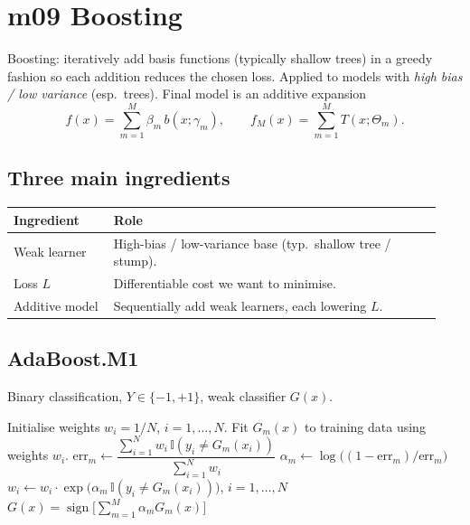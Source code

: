 \section{m09 Boosting}

Boosting: iteratively add basis functions (typically shallow trees) in a greedy fashion so each addition reduces the chosen loss. Applied to models with \emph{high bias / low variance} (esp.\ trees). Final model is an additive expansion
\[ f(x)=\sum_{m=1}^M \beta_m\, b(x;\gamma_m), \qquad f_M(x)=\sum_{m=1}^M T(x;\Theta_m). \]

\subsection{Three main ingredients}
\begin{tabular}{@{}p{0.22\linewidth} p{0.72\linewidth}@{}}
\toprule
Ingredient & Role \\
\midrule
Weak learner & High-bias / low-variance base (typ.\ shallow tree / stump). \\
Loss $L$ & Differentiable cost we want to minimise. \\
Additive model & Sequentially add weak learners, each lowering $L$. \\
\bottomrule
\end{tabular}

\subsection{AdaBoost.M1}
Binary classification, $Y\in\{-1,+1\}$, weak classifier $G(x)$.

\begin{algorithm}[H]
\caption{AdaBoost.M1}
\begin{algorithmic}
\State Initialise weights $w_i = 1/N$, $i=1,\dots,N$.
  \State Fit $G_m(x)$ to training data using weights $w_i$.
  \State $\text{err}_m \gets \dfrac{\sum_{i=1}^N w_i\, \mathbb{I}(y_i \neq G_m(x_i))}{\sum_{i=1}^N w_i}$
  \State $\alpha_m \gets \log\!\big((1-\text{err}_m)/\text{err}_m\big)$
  \State $w_i \gets w_i \cdot \exp\!\big(\alpha_m\, \mathbb{I}(y_i \neq G_m(x_i))\big)$, $i=1,\dots,N$
\EndFor
\State \Return $G(x) = \operatorname{sign}\!\Big[\sum_{m=1}^M \alpha_m G_m(x)\Big]$
\end{algorithmic}
\end{algorithm}

